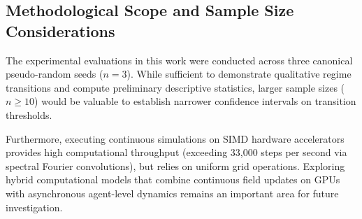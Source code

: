 \subsection{Methodological Scope and Sample Size Considerations}
\label{subsec:disc_parallelization_paradox}

The experimental evaluations in this work were conducted across three canonical pseudo-random seeds ($n=3$). While sufficient to demonstrate qualitative regime transitions and compute preliminary descriptive statistics, larger sample sizes ($n \ge 10$) would be valuable to establish narrower confidence intervals on transition thresholds. 

Furthermore, executing continuous simulations on SIMD hardware accelerators provides high computational throughput (exceeding 33,000 steps per second via spectral Fourier convolutions), but relies on uniform grid operations. Exploring hybrid computational models that combine continuous field updates on GPUs with asynchronous agent-level dynamics remains an important area for future investigation.